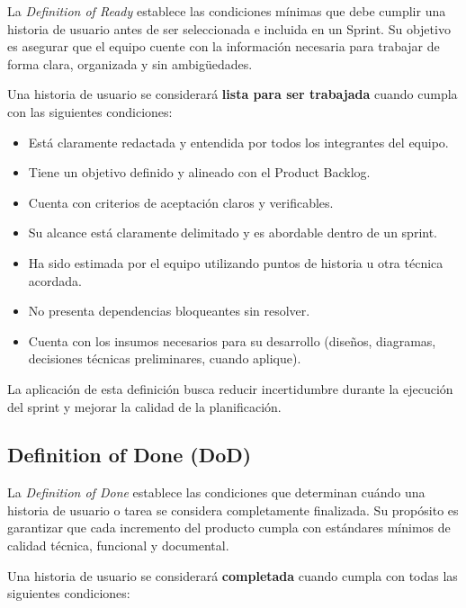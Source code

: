 \documentclass[12pt]{article}
\begin{document}
La \textit{Definition of Ready} establece las condiciones mínimas que debe cumplir una historia de usuario antes de ser seleccionada e incluida en un Sprint. Su objetivo es asegurar que el equipo cuente con la información necesaria para trabajar de forma clara, organizada y sin ambigüedades.

Una historia de usuario se considerará \textbf{lista para ser trabajada} cuando cumpla con las siguientes condiciones:

\begin{itemize}
    \item Está claramente redactada y entendida por todos los integrantes del equipo.
    \item Tiene un objetivo definido y alineado con el Product Backlog.
    \item Cuenta con criterios de aceptación claros y verificables.
    \item Su alcance está claramente delimitado y es abordable dentro de un sprint.
    \item Ha sido estimada por el equipo utilizando puntos de historia u otra técnica acordada.
    \item No presenta dependencias bloqueantes sin resolver.
    \item Cuenta con los insumos necesarios para su desarrollo (diseños, diagramas, decisiones técnicas preliminares, cuando aplique).
\end{itemize}

La aplicación de esta definición busca reducir incertidumbre durante la ejecución del sprint y mejorar la calidad de la planificación.

\subsection{Definition of Done (DoD)}

La \textit{Definition of Done} establece las condiciones que determinan cuándo una historia de usuario o tarea se considera completamente finalizada. Su propósito es garantizar que cada incremento del producto cumpla con estándares mínimos de calidad técnica, funcional y documental.

Una historia de usuario se considerará \textbf{completada} cuando cumpla con todas las siguientes condiciones:
\end{document}
